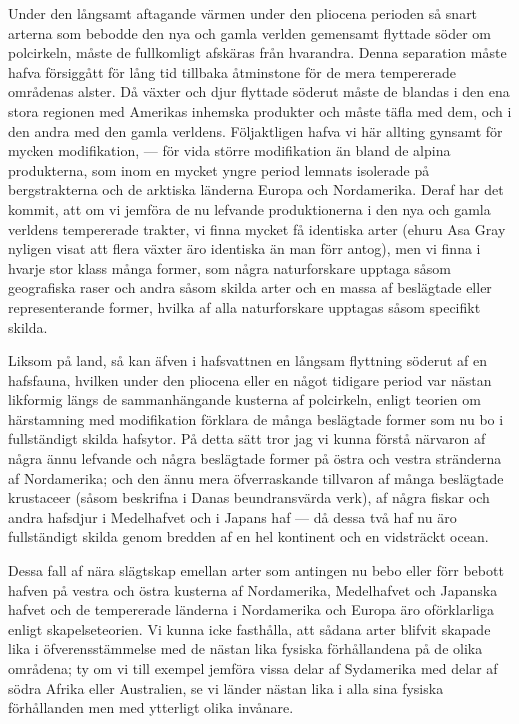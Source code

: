 Under den långsamt aftagande värmen under den pliocena perioden så snart arterna som bebodde den nya och gamla verlden gemensamt flyttade söder om polcirkeln, måste de fullkomligt afskäras från hvarandra. Denna separation måste hafva försiggått för lång tid tillbaka åtminstone för de mera tempererade områdenas alster. Då växter och djur flyttade söderut måste de blandas i den ena stora regionen med Amerikas inhemska produkter och måste täfla med dem, och i den andra med den gamla verldens. Följaktligen hafva vi här allting gynsamt för mycken modifikation, — för vida större modifikation än bland de alpina produkterna, som inom en mycket yngre period lemnats isolerade på bergstrakterna och de arktiska länderna Europa och Nordamerika. Deraf har det kommit, att om vi jemföra de nu lefvande produktionerna i den nya och gamla verldens tempererade trakter, vi finna mycket få identiska arter (ehuru Asa Gray nyligen visat att flera växter äro identiska än man förr antog), men vi finna i hvarje stor klass många former, som några naturforskare upptaga såsom geografiska raser och andra såsom skilda arter och en massa af beslägtade eller representerande former, hvilka af alla naturforskare upptagas såsom specifikt skilda.

Liksom på land, så kan äfven i hafsvattnen en långsam flyttning söderut af en hafsfauna, hvilken under den pliocena eller en något tidigare period var nästan likformig längs de sammanhängande kusterna af polcirkeln, enligt teorien om härstamning med modifikation förklara de många beslägtade former som nu bo i fullständigt skilda hafsytor. På detta sätt tror jag vi kunna förstå närvaron af några ännu lefvande och några beslägtade former på östra och vestra stränderna af Nordamerika; och den ännu mera öfverraskande tillvaron af många beslägtade krustaceer (såsom beskrifna i Danas beundransvärda verk), af några fiskar och andra hafsdjur i Medelhafvet och i Japans haf — då dessa två haf nu äro fullständigt skilda genom bredden af en hel kontinent och en vidsträckt ocean.

Dessa fall af nära slägtskap emellan arter som antingen nu bebo eller förr bebott hafven på vestra och östra kusterna af Nordamerika, Medelhafvet och Japanska hafvet och de tempererade länderna i Nordamerika och Europa äro oförklarliga enligt skapelseteorien. Vi kunna icke fasthålla, att sådana arter blifvit skapade lika i öfverensstämmelse med de nästan lika fysiska förhållandena på de olika områdena; ty om vi till exempel jemföra vissa delar af Sydamerika med delar af södra Afrika eller Australien, se vi länder nästan lika i alla sina fysiska förhållanden men med ytterligt olika invånare.



